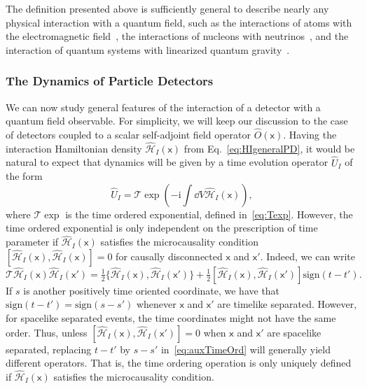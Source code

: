 \documentclass[letterpaper,12pt,titlepage,oneside,final]{book}
\newcommand{\mf}{\mathsf}%
\newcommand{\ii}{\mathrm{i}}
\begin{document}
The definition presented above is sufficiently general to describe nearly any physical interaction with a quantum field, such as the interactions of atoms with the electromagnetic field~\cite{Pozas2016,Nicho1,richard}, the interactions of nucleons with neutrinos~\cite{neutrinos,antiparticles,carol}, and the interaction of quantum systems with linearized quantum gravity~\cite{remi,pitelli,boris}.

\subsubsection*{The Dynamics of Particle Detectors}

We can now study general features of the interaction of a detector with a quantum field observable. For simplicity, we will keep our discussion to the case of detectors coupled to a scalar self-adjoint field operator $\hat{O}(\mf x)$. Having the interaction Hamiltonian density $\hat{\mathcal{H}}_I(\mf x)$ from Eq.~\eqref{eq:HIgeneralPD}, it would be natural to expect that dynamics will be given by a time evolution operator $\hat{U}_I$ of the form
\begin{equation}
    \hat{U}_I = \mathcal{T}\exp(-\ii \int \dd V \hat{\mathcal{H}}_I(\mf x)),
\end{equation}
where $\mathcal{T}\exp$ is the time ordered exponential, defined in~\eqref{eq:Texp}. However, the time ordered exponential is only independent on the prescription of time parameter if $\hat{\mathcal{H}}_I(\mf x)$ satisfies the microcausality condition $[\hat{\mathcal{H}}_I(\mf x),\hat{\mathcal{H}}_I(\mf x)] = 0$ for causally disconnected $\mf x$ and $\mf x'$. Indeed, we can write
\begin{equation}\label{eq:auxTimeOrd}
    \mathcal{T}\hat{\mathcal{H}}_I(\mf x)\hat{\mathcal{H}}_I(\mf x') = \tfrac{1}{2}\{\hat{\mathcal{H}}_I(\mf x),\hat{\mathcal{H}}_I(\mf x')\} + \tfrac{1}{2}[\hat{\mathcal{H}}_I(\mf x),\hat{\mathcal{H}}_I(\mf x')]\text{sign}(t-t').
\end{equation}
If $s$ is another positively time oriented coordinate, we have that $\text{sign}(t-t') = \text{sign}(s-s')$ whenever $\mf x$ and $\mf x'$ are timelike separated. However, for spacelike separated events, the time coordinates might not have the same order. Thus, unless $[\hat{\mathcal{H}}_I(\mf x),\hat{\mathcal{H}}_I(\mf x')] = 0$ when $\mf x$ and $\mf x'$ are spacelike separated, replacing $t-t'$ by $s-s'$ in~\eqref{eq:auxTimeOrd} will generally yield different operators. That is, the time ordering operation is only uniquely defined if $\hat{\mathcal{H}}_I(\mf x)$ satisfies the microcausality condition. 
\end{document}
